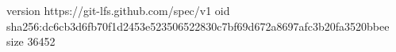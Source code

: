 version https://git-lfs.github.com/spec/v1
oid sha256:dc6cb3d6fb70f1d2453e523506522830c7bf69d672a8697afc3b20fa3520bbee
size 36452
